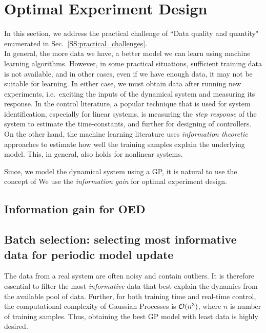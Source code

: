\section{Optimal Experiment Design}
\label{S:oed}

In this section, we address the practical challenge of ``Data quality and quantity" enumerated in Sec.~\ref{SS:practical_challenges}.
\\

In general, the more data we have, a better model we can learn using machine learning algorithms. However, in some practical situations, sufficient training data is not available, and in other cases, even if we have enough data, it may not be suitable for learning. In either case, we must obtain data after running new experiments, i.e.~exciting the inputs of the dynamical system and measuring its response. In the control literature, a popular technique that is used for system identification, especially for linear systems, is measuring the \textit{step response} of the system to estimate the time-constants, and further for designing of controllers. On the other hand, the machine learning literature uses \textit{information theoretic} approaches to estimate how well the training samples explain the underlying model. This, in general, also holds for nonlinear systems.

Since, we model the dynamical system using a GP, it is natural to use the concept of We use the \textit{information gain} for optimal experiment design.


\subsection{Information gain for OED}

\subsection{Batch selection: selecting most informative data for periodic model update}

The data from a real system are often noisy and contain outliers. 
It is therefore essential to filter the most \textit{informative} data that best explain the dynamics from the available pool of data.
Further, for both training time and real-time control, the computational complexity of Gaussian Processes is $\mathcal{O}(n^3)$, where $n$ is number of training samples. Thus, obtaining the best GP model with least data is highly desired.


